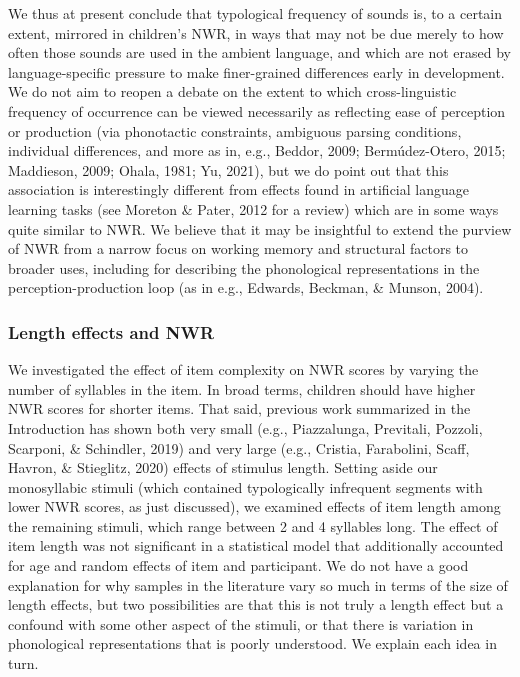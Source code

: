 \documentclass[
  american,
  ,man,floatsintext]{apa6}
\begin{document}
We thus at present conclude that typological frequency of sounds is, to a certain extent, mirrored in children's NWR, in ways that may not be due merely to how often those sounds are used in the ambient language, and which are not erased by language-specific pressure to make finer-grained differences early in development. We do not aim to reopen a debate on the extent to which cross-linguistic frequency of occurrence can be viewed necessarily as reflecting ease of perception or production (via phonotactic constraints, ambiguous parsing conditions, individual differences, and more as in, e.g., Beddor, 2009; Bermúdez-Otero, 2015; Maddieson, 2009; Ohala, 1981; Yu, 2021), but we do point out that this association is interestingly different from effects found in artificial language learning tasks (see Moreton \& Pater, 2012 for a review) which are in some ways quite similar to NWR. We believe that it may be insightful to extend the purview of NWR from a narrow focus on working memory and structural factors to broader uses, including for describing the phonological representations in the perception-production loop (as in e.g., Edwards, Beckman, \& Munson, 2004).

\hypertarget{length-effects-and-nwr}{%
\subsubsection{Length effects and NWR}\label{length-effects-and-nwr}}

We investigated the effect of item complexity on NWR scores by varying the number of syllables in the item. In broad terms, children should have higher NWR scores for shorter items. That said, previous work summarized in the Introduction has shown both very small (e.g., Piazzalunga, Previtali, Pozzoli, Scarponi, \& Schindler, 2019) and very large (e.g., Cristia, Farabolini, Scaff, Havron, \& Stieglitz, 2020) effects of stimulus length. Setting aside our monosyllabic stimuli (which contained typologically infrequent segments with lower NWR scores, as just discussed), we examined effects of item length among the remaining stimuli, which range between 2 and 4 syllables long. The effect of item length was not significant in a statistical model that additionally accounted for age and random effects of item and participant. We do not have a good explanation for why samples in the literature vary so much in terms of the size of length effects, but two possibilities are that this is not truly a length effect but a confound with some other aspect of the stimuli, or that there is variation in phonological representations that is poorly understood. We explain each idea in turn.
\end{document}
